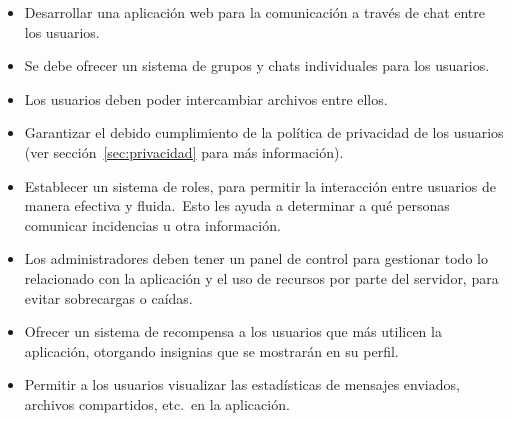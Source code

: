 \begin{itemize}
	\item Desarrollar una aplicación web para la comunicación a través de chat entre los usuarios.
	\item Se debe ofrecer un sistema de grupos y chats individuales para los usuarios.
	\item Los usuarios deben poder intercambiar archivos entre ellos.
	\item Garantizar el debido cumplimiento de la política de privacidad de los usuarios
	(ver sección~\ref{sec:privacidad} para más información).
	\item Establecer un sistema de roles, para permitir la interacción entre usuarios de manera
	efectiva y fluida.\ Esto les ayuda a determinar a qué personas comunicar incidencias u otra
	información.
	\item Los administradores deben tener un panel de control para gestionar todo lo relacionado con la aplicación
	y el uso de recursos por parte del servidor, para evitar sobrecargas o caídas.
	\item Ofrecer un sistema de recompensa a los usuarios que más utilicen la aplicación, otorgando insignias
	que se mostrarán en su perfil.
	\item Permitir a los usuarios visualizar las estadísticas de mensajes enviados, archivos compartidos, etc.\ en
	la aplicación.
\end{itemize}
\label{itm:alcance_objetivos}
